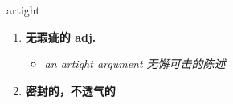 
\begin{frame}
{\huge artight}
\begin{center}
\begin{enumerate}\Large
  \item \textbf{无瑕疵的 adj.}
  \begin{itemize}
    \item \em{\Large{an artight argument 无懈可击的陈述}}
  \end{itemize}
  \item \textbf{密封的，不透气的}
\end{enumerate}
\end{center}
\end{frame}

